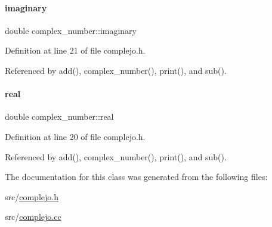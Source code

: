 \paragraph{\texorpdfstring{imaginary}{imaginary}}
{\footnotesize\ttfamily double complex\+\_\+number\+::imaginary\hspace{0.3cm}{\ttfamily [private]}}



Definition at line 21 of file complejo.\+h.



Referenced by add(), complex\+\_\+number(), print(), and sub().

\mbox{\label{classcomplex__number_a57a6f97bb6028f8f98c321514d2aa7a0}} 
\paragraph{\texorpdfstring{real}{real}}
{\footnotesize\ttfamily double complex\+\_\+number\+::real\hspace{0.3cm}{\ttfamily [private]}}



Definition at line 20 of file complejo.\+h.



Referenced by add(), complex\+\_\+number(), print(), and sub().



The documentation for this class was generated from the following files\+:\begin{DoxyCompactItemize}
\item 
src/\hyperlink{complejo_8h}{complejo.\+h}\item 
src/\hyperlink{complejo_8cc}{complejo.\+cc}\end{DoxyCompactItemize}
